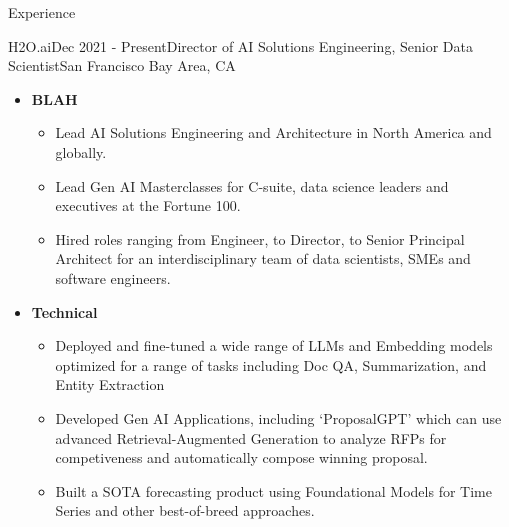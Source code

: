 \documentclass{resume} %
\begin{document}

\begin{rSection}{Experience}
\begin{rSubsection}{H2O.ai}{Dec 2021 - Present}{Director of AI Solutions Engineering, Senior Data Scientist}{San Francisco Bay Area, CA}

\begin{itemize}
	\item {\bf BLAH}
		\begin{itemize}
		\item Lead AI Solutions Engineering and Architecture in North America and globally.
		\item Lead Gen AI Masterclasses for C-suite, data science leaders and executives at the Fortune 100.
		\item Hired roles ranging from Engineer, to Director, to Senior Principal Architect for an interdisciplinary team of data scientists, SMEs and software engineers.
		\end{itemize}
	\item {\bf Technical}
		\begin{itemize}
		\item Deployed and fine-tuned a wide range of LLMs and Embedding models optimized for a range of tasks including Doc QA, Summarization, and Entity Extraction
		\item Developed Gen AI Applications, including `ProposalGPT' which can use advanced Retrieval-Augmented Generation to analyze RFPs for competiveness and automatically compose winning proposal.
		\item Built a SOTA forecasting product using Foundational Models for Time Series and other best-of-breed approaches.
		\end{itemize}

\end{itemize}



\end{rSubsection}
\end{rSection}
\end{document}
